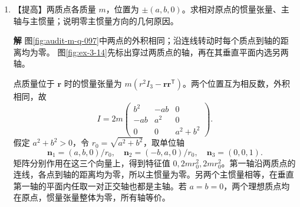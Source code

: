 \documentclass[11pt,openany,fontset=fandol]{ctexbook}
\theoremstyle{plain}\newtheorem{theorem}{定理}[chapter]\newtheorem{proposition}[theorem]{命题}
\theoremstyle{definition}\newtheorem{definition}{定义}[chapter]\newtheorem{example}{例}[chapter]
\theoremstyle{remark}\newtheorem*{remark}{说明}
\newcommand{\SolutionStart}{\par\nobreak\medskip\nobreak\noindent\textbf{解}\quad\ignorespaces}
\newenvironment{solution}{\SolutionStart}{\par\medskip}
\newcommand{\vct}[1]{\bm{#1}}\newcommand{\Rea}{\operatorname{Re}}\newcommand{\Ima}{\operatorname{Im}}
\begin{document}
\begin{enumerate}[label=3.\arabic*]
\begin{solution}
\begin{figure}[H]\centering
{}
\caption{题3.13解图：质量归一化后，第 $j$ 个正常坐标相当于单位质量、刚度 $\omega_j^2$、阻尼 $d_j$ 的独立振子。图中系数属于模态坐标。}\label{fig:hw-3-13}
\end{figure}

若 $\omega_j=0$，该模变为 $\ddot q_j+\alpha\dot q_j=F_j$，应直接求解，不能套含 $1/\omega_j$ 的阻尼比。也不能仅分别看 $\alpha,\beta$ 的符号，而不检查实际的各个 $d_j$。

图上刚度是 $\omega_j^2$，阻尼是 $d_j$，因此临界条件直接为 $d_j=2\omega_j$；零刚度模应另行处理。
\end{solution}

\item \begin{minipage}[t]{\linewidth}
【提高】两质点各质量 $m$，位置为 $\pm(a,b,0)$。求相对原点的惯量张量、主轴与主惯量；说明零主惯量方向的几何原因。

\end{minipage}

\begin{solution}
图\ref{fig:audit-m-q-097}中两点的外积相同；沿连线转动时每个质点到轴的距离均为零。
图\ref{fig:ex-3-14}先标出穿过两质点的轴，再在其垂直平面内选另两轴。

点质量位于 $\vct r$ 时的惯量张量为 $m(r^2I_3-\vct r\vct r^{\mathsf T})$。两个位置互为相反数，外积相同，故
\[
I=2m\begin{pmatrix}b^2&-ab&0\\-ab&a^2&0\\0&0&a^2+b^2\end{pmatrix}.
\]
假定 $a^2+b^2>0$，令 $r_0=\sqrt{a^2+b^2}$，取单位轴
\[
\vct n_1=(a,b,0)/r_0,\quad
\vct n_2=(-b,a,0)/r_0,\quad
\vct n_3=(0,0,1).
\]
矩阵分别作用在这三个向量上，得到特征值 $0,2mr_0^2,2mr_0^2$。第一轴沿两质点的连线，各点到轴的距离均为零，所以主惯量为零。另两个主惯量相等，在垂直第一轴的平面内任取一对正交轴也都是主轴。若 $a=b=0$，两个理想质点均在原点，惯量张量整体为零，所有轴等价。


\end{solution}
\end{enumerate}
\end{document}
